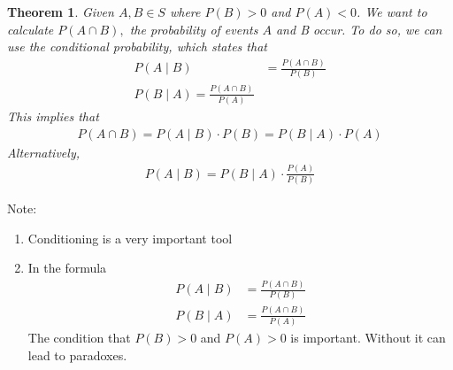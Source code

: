\documentclass[11pt,oneside]{book}
\theoremstyle{newStyle}
\newtheorem{thm}{Theorem}[chapter]
\newcommand{\note}{\color{red}Note: \color{black}}
\begin{document}
\begin{center}
\end{center}
\begin{thm}
Given $A,B\in S$ where $P(B)>0$ and $P(A)<0$. We want to calculate $P(A\cap B),$ the probability of events $A$ and B occur. To do so, we can use the conditional probability, which states that \begin{align*}
P(A\mid B)&=\frac{P(A\cap B)}{P(B)}\\
P(B\mid A)=\frac{P(A\cap B)}{P(A)}
\end{align*} 
This implies that \begin{align*}
P(A\cap B)=P(A\mid B)\cdot P(B)=P(B\mid A)\cdot P(A)
\end{align*}
Alternatively, \begin{align*}
P(A\mid B)=P(B\mid A)\cdot \frac{P(A)}{P(B)}
\end{align*}
\end{thm}
\note \begin{enumerate}[itemsep=0pt, topsep=1pt, partopsep=0pt]
\item Conditioning is a very important tool
\item In the formula \begin{align*}
P(A\mid B)&=\frac{P(A\cap B)}{P(B)}\\
P(B\mid A)&=\frac{P(A\cap B)}{P(A)}
\end{align*}
The condition that $P(B)>0$ and $P(A)>0$ is important. Without it can lead to paradoxes.
\end{enumerate}
\end{document}
